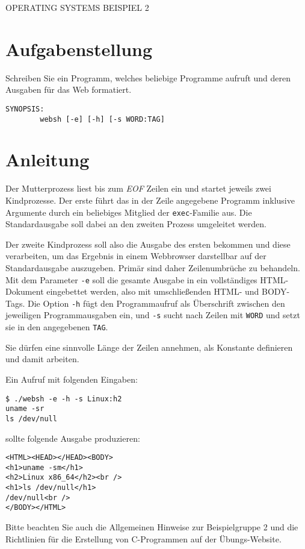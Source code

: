 \documentclass{article}
\begin{document}
\begin{center}
\begin{Large}
OPERATING SYSTEMS BEISPIEL 2
\end{Large}
\end{center}




\section*{Aufgabenstellung}

Schreiben Sie ein Programm, welches beliebige Programme aufruft und
deren Ausgaben für das Web formatiert.

\begin{verbatim}
SYNOPSIS:
        websh [-e] [-h] [-s WORD:TAG]
\end{verbatim}



\section*{Anleitung}

Der Mutterprozess liest bis zum \textit{EOF} Zeilen ein und startet
jeweils zwei Kindprozesse. Der erste führt das in der Zeile angegebene
Programm inklusive Argumente durch ein beliebiges Mitglied der
\verb_exec_-Familie aus. Die Standardausgabe soll dabei an den zweiten
Prozess umgeleitet werden.

Der zweite Kindprozess soll also die Ausgabe des ersten bekommen und
diese verarbeiten, um das Ergebnis in einem Webbrowser darstellbar auf
der Standardausgabe auszugeben. Primär sind daher Zeilenumbrüche zu
behandeln. Mit dem Parameter \verb_-e_ soll die gesamte Ausgabe in ein
vollständiges HTML-Dokument eingebettet werden, also mit
umschließenden HTML- und BODY-Tags. Die Option \verb_-h_ fügt den
Programmaufruf als Überschrift zwischen den jeweiligen
Programmausgaben ein, und \verb_-s_ sucht nach Zeilen mit \verb_WORD_
und setzt sie in den angegebenen \verb_TAG_.

Sie dürfen eine sinnvolle Länge der Zeilen annehmen, als Konstante
definieren und damit arbeiten.

Ein Aufruf mit folgenden Eingaben: 

\begin{verbatim}
$ ./websh -e -h -s Linux:h2
uname -sr
ls /dev/null
\end{verbatim}

sollte folgende Ausgabe produzieren:

\begin{verbatim}
<HTML><HEAD></HEAD><BODY>
<h1>uname -sm</h1>
<h2>Linux x86_64</h2><br />
<h1>ls /dev/null</h1>
/dev/null<br />
</BODY></HTML> 
\end{verbatim}

Bitte beachten Sie auch die Allgemeinen Hinweise zur
Beispielgruppe 2 und die Richtlinien für die Erstellung von
C-Programmen auf der Übungs-Website.
\end{document}
